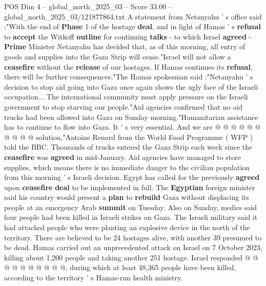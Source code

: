 \begin{textsample}{POS Dim 4 – global\_north\_2025\_03 – Score 33.00 – global\_north\_2025\_03/121877864.txt}
A statement from Netanyahu ' s office said :"With the end of \textbf{Phase} 1 of the hostage \textbf{deal}, and in light of Hamas ' s \textbf{refusal} to \textbf{accept} the Witkoff \textbf{outline} for continuing \textbf{talks} - to which Israel \textbf{agreed} - \textbf{Prime} Minister Netanyahu has decided that, as of this morning, all entry of goods and supplies into the Gaza Strip will cease."Israel will not allow a \textbf{ceasefire} without the \textbf{release} of our hostages.
If Hamas continues its \textbf{refusal}, there will be further consequences."The Hamas spokesman said :"Netanyahu ' s decision to stop aid going into Gaza once again shows the ugly face of the Israeli occupation...
The international community must apply pressure on the Israeli government to stop starving our people."Aid agencies confirmed that no aid trucks had been allowed into Gaza on Sunday morning."Humanitarian assistance has to continue to flow into Gaza.
It ' s very essential.
And we are @ @ @ @ @ @ @ @ @ @ solution,"Antoine Renard from the World Food Programme ( WFP ) told the BBC.
Thousands of trucks entered the Gaza Strip each week since the \textbf{ceasefire} was \textbf{agreed} in mid-January.
Aid agencies have managed to store supplies, which means there is no immediate danger to the civilian population from this morning ' s Israeli decision.
Egypt has called for the previously \textbf{agreed} upon \textbf{ceasefire} \textbf{deal} to be implemented in full.
The \textbf{Egyptian} foreign minister said his country would present a \textbf{plan} to \textbf{rebuild} Gaza without displacing its people at an emergency Arab \textbf{summit} on Tuesday.
Also on Sunday, medics said four people had been killed in Israeli strikes on Gaza.
The Israeli military said it had attacked people who were planting an explosive device in the north of the territory.
There are believed to be 24 hostages alive, with another 39 presumed to be dead.
Hamas carried out an unprecedented attack on Israel on 7 October 2023, killing about 1,200 people and taking another 251 hostage.
Israel responded @ @ @ @ @ @ @ @ @ @, during which at least 48,365 people have been killed, according to the territory ' s Hamas-run health ministry.

\end{textsample}
